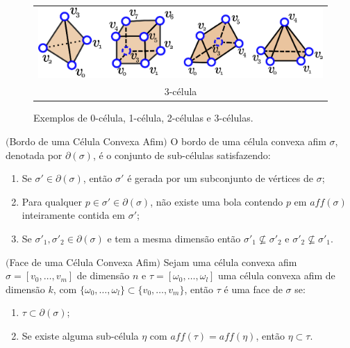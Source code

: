 \begin{figure}[h]
\begin{center}
\begin{tabular}{c}
 \includegraphics[angle=0,scale=0.65]{imagens/cap2/fig6-3.eps} \\
3-célula \\
\end{tabular}
\end{center}
\caption{Exemplos de 0-célula, 1-célula, 2-células e 3-células.}
\end{figure}


\begin{defi} $($Bordo de uma Célula Convexa Afim$)$
O bordo de uma c\'elula convexa afim $\sigma$, denotada por $\partial(\sigma)$,
é o conjunto de sub-células satisfazendo:
\begin{enumerate}
\item Se $\sigma' \in \partial(\sigma)$, então $\sigma'$ é gerada por um subconjunto de vértices de $\sigma$;
\item Para qualquer $p \in \sigma' \in \partial(\sigma)$, não existe uma bola contendo $p$ em $aff(\sigma)$ inteiramente contida em $\sigma'$;
\item Se $\sigma'_1, \sigma'_2 \in \partial(\sigma)$ e tem a mesma dimensão então  $\sigma'_1 \nsubseteq \sigma'_2$ e $\sigma'_2 \nsubseteq \sigma'_1$.
\end{enumerate}
\end{defi}

\begin{defi} $($Face de uma Célula Convexa Afim$)$
Sejam uma célula convexa afim $\sigma = [v_{0},\ldots,v_{m}]$ de dimensão $n$ e
$\tau = [\omega_{0},\ldots,\omega_{l}]$ uma célula convexa afim de dimensão $k$,
com $\{\omega_{0},\ldots,\omega_{l}\} \subset \{v_{0},\ldots,v_{m}\}$, 
então $\tau$ é uma face de $\sigma$ se:
\begin{enumerate}
\item $\tau \subset \partial(\sigma)$; 
\item Se existe alguma sub-célula $\eta$ com $aff(\tau) = aff(\eta)$, então $\eta \subset \tau$.
\end{enumerate}
\end{defi}

